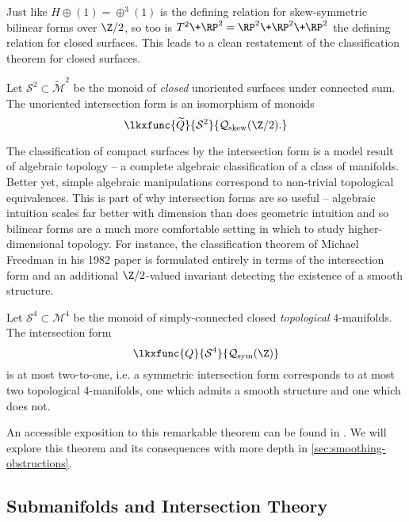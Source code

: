 Just like $H\oplus (1)= \oplus^3 (1)$ is the defining relation for skew-symmetric bilinear forms over $\Z/2$, so too is $T^2\+ \RP^2 = \RP^2\+\RP^2\+\RP^2$ the defining relation for closed surfaces. This leads to a clean restatement of the classification theorem for closed surfaces.

\begin{theorem}
	Let $\mathcal{S}^2\subset \widetilde{\mathcal{M}}^2$ be the monoid of \textit{closed} unoriented surfaces under connected sum. The unoriented intersection form is an isomorphism of monoids
	\[
		\lkxfunc{\widetilde{Q}}{\mathcal{S}^2}{\mathcal{Q}_{\mathrm{skew}}(\Z/2).}
	\]
\end{theorem}

The classification of compact surfaces by the intersection form is a model result of algebraic topology -- a complete algebraic classification of a class of manifolds. Better yet, simple algebraic manipulations correspond to non-trivial topological equivalences. This is part of why intersection forms are so useful -- algebraic intuition scales far better with dimension than does geometric intuition and so bilinear forms are a much more comfortable setting in which to study higher-dimensional topology. For instance, the classification theorem of Michael Freedman in his 1982 paper \cite{freedman1982manifold} is formulated entirely in terms of the intersection form and an additional $\Z/2$-valued invariant detecting the existence of a smooth structure.

\begin{theorem}[Freedman, 1982] Let $\mathcal{S}^4\subset \mathcal{M}^4$ be the monoid of simply-connected closed \emph{topological} $4$-manifolds. The intersection form
	\[
		\lkxfunc{Q}{\mathcal{S}^4}{\mathcal{Q}_{\mathrm{sym}}(\Z)}
	\]
	is at most two-to-one, i.e. a symmetric intersection form corresponds to at most two topological $4$-manifolds, one which admits a smooth structure and one which does not.
\end{theorem}
An accessible exposition to this remarkable theorem can be found in \cite{behrens2021discembedding}. We will explore this theorem and its consequences with more depth in \cref{sec:smoothing-obstructions}.

\subsection{Submanifolds and Intersection Theory}\label{sec:submanifolds-intersection-theory}

